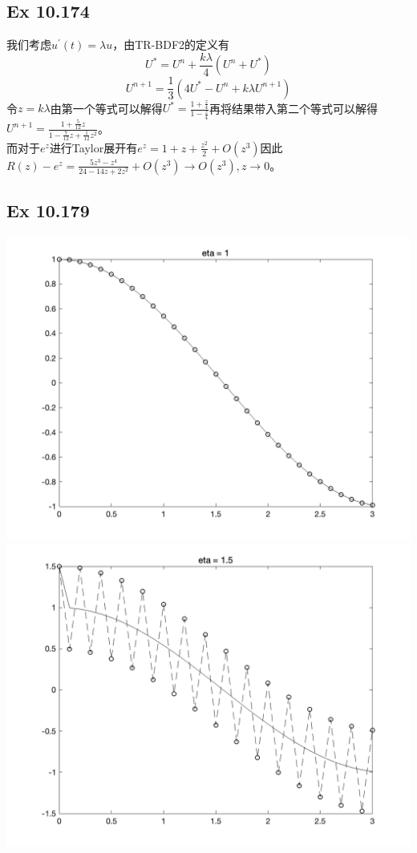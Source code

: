 \documentclass{article}
\begin{document}
\subsection*{Ex 10.174}
\indent 我们考虑$u^{'}(t)=\lambda u$，由TR-BDF2的定义有
$$
U^{*}=U^n+\frac{k\lambda}{4}(U^n+U^{*})
$$
$$
U^{n+1}=\frac{1}{3}(4U^{*}-U^n+k\lambda U^{n+1})
$$
令$z=k\lambda$由第一个等式可以解得$U^{*}=\frac{1+\frac{z}{4}}{1-\frac{z}{4}}$再将结果带入第二个等式可以解得$U^{n+1}=\frac{1+\frac{5}{12}z}{1-\frac{7}{12}z+\frac{1}{12}z^2}$。\\
\indent 而对于$e^z$进行Taylor展开有$e^z=1+z+\frac{z^2}{2}+O(z^3)$因此$R(z)-e^z=\frac{5z^3-z^4}{24-14z+2z^2}+O(z^3)\rightarrow O(z^3),z\rightarrow0$。

\subsection*{Ex 10.179}
\includegraphics[scale = 0.125]{Ex179_1.png}
\includegraphics[scale = 0.125]{Ex179_2.png}
\end{document}
